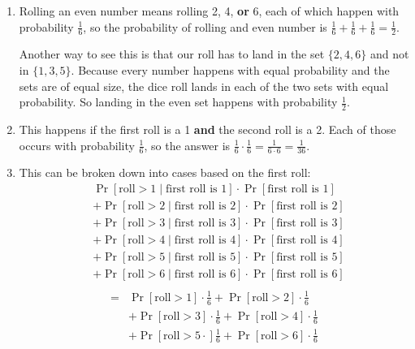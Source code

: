 \begin{answer}
    \renewcommand{\labelenumi}{(\alph{enumi})} 
    \begin{enumerate}
        \item Rolling an even number means rolling 2, 4, \textbf{or} 6, each 
        of which happen with probability $\frac{1}{6}$, so the probability of 
        rolling and even number is $\frac{1}{6}+\frac{1}{6}+\frac{1}{6}=\frac{1}{2}$.

        Another way to see this is that our roll has to land in the set 
        $\{2,4,6\}$ and not in $\{1,3,5\}$. Because every number happens 
        with equal probability and the sets are of equal size, the dice 
        roll lands in each of the two sets with equal probability. So landing 
        in the even set happens with probability $\frac{1}{2}$.
        \item This happens if the first roll is a 1 \textbf{and} the second roll 
        is a 2. Each of those occurs with probability $\frac{1}{6}$, so the 
        answer is $\frac{1}{6}\cdot \frac{1}{6} = \frac{1}{6\cdot6}=\frac{1}{36}$.
        \item This can be broken down into cases based on the first roll:
        \begin{align*}
            &\Pr[\text{roll} > 1 \mid \text{first roll is }1]\cdot\Pr[\text{first roll is }1]\\
            &+\Pr[\text{roll} > 2 \mid \text{first roll is }2]\cdot\Pr[\text{first roll is }2]\\
            &+\Pr[\text{roll} > 3 \mid \text{first roll is }3]\cdot\Pr[\text{first roll is }3]\\
            &+\Pr[\text{roll} > 4 \mid \text{first roll is }4]\cdot\Pr[\text{first roll is }4]\\
            &+\Pr[\text{roll} > 5 \mid \text{first roll is }5]\cdot\Pr[\text{first roll is }5]\\
            &+\Pr[\text{roll} > 6 \mid \text{first roll is }6]\cdot\Pr[\text{first roll is }6]\\
        \end{align*}
        \begin{align*}
            =&\Pr[\text{roll} > 1]\cdot \frac{1}{6}
            +\Pr[\text{roll} > 2]\cdot \frac{1}{6}\\
            &+\Pr[\text{roll} > 3]\cdot \frac{1}{6}
            +\Pr[\text{roll} > 4]\cdot \frac{1}{6}\\
            &+\Pr[\text{roll} > 5\cdot] \frac{1}{6}
            +\Pr[\text{roll} > 6]\cdot \frac{1}{6}\\

\end{align*}
\end{enumerate}
\end{answer}
